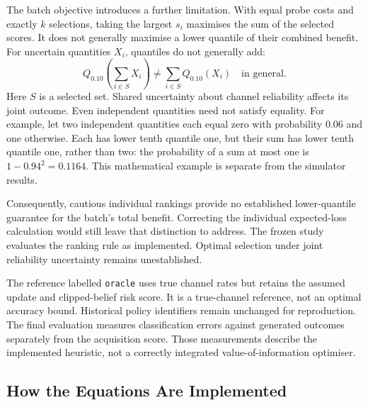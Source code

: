 The batch objective introduces a further limitation. With equal probe costs and exactly $k$ selections, taking the largest
$s_i$ maximises the sum of the selected scores. It does not generally maximise a lower quantile of their combined benefit.
For uncertain quantities $X_i$, quantiles do not generally add:
\begin{equation}
 Q_{0.10}\!\left(\sum_{i\in S}X_i\right)
 \ne \sum_{i\in S}Q_{0.10}(X_i)
 \quad\text{in general}.
\end{equation}
Here $S$ is a selected set. Shared uncertainty about channel reliability affects its joint outcome. Even independent quantities
need not satisfy equality. For example, let two independent quantities each equal zero with probability $0.06$ and one otherwise.
Each has lower tenth quantile one, but their sum has lower tenth quantile one, rather than two: the probability of a sum at most
one is $1-0.94^2=0.1164$. This mathematical example is separate from the simulator results.

Consequently, cautious individual rankings provide no established lower-quantile guarantee for the batch's total benefit.
Correcting the individual expected-loss calculation would still leave that distinction to address. The frozen study evaluates
the ranking rule as implemented. Optimal selection under joint reliability uncertainty remains unestablished.

The reference labelled \texttt{oracle} uses true channel rates but retains the assumed update and clipped-belief risk score.
It is a true-channel reference, not an optimal accuracy bound. Historical policy identifiers remain unchanged for reproduction.
The final evaluation measures classification errors against generated outcomes separately from the acquisition score. Those
measurements describe the implemented heuristic, not a correctly integrated value-of-information optimiser.

\subsection{How the Equations Are Implemented}

